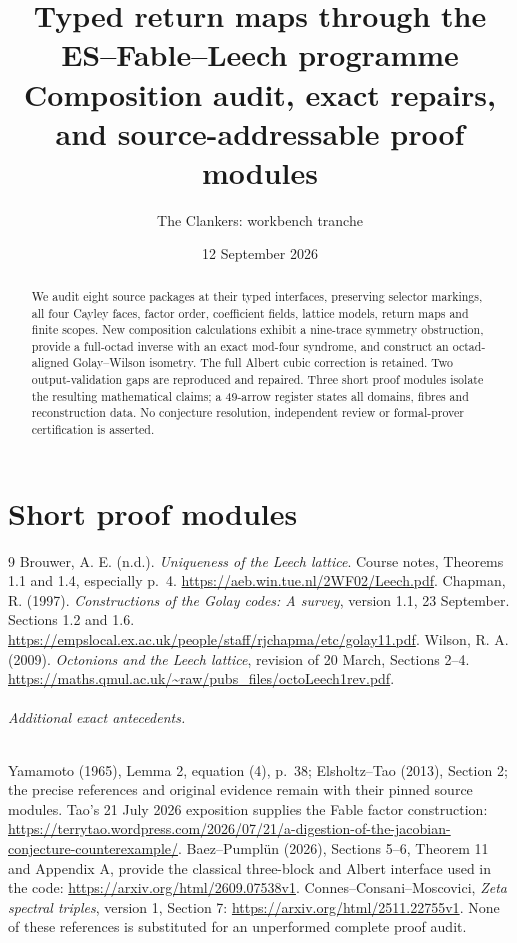\documentclass[10pt,reqno]{amsart}
\title[Typed return maps and composition audit]{Typed return maps through the ES--Fable--Leech programme\\
Composition audit, exact repairs, and source-addressable proof modules}
\author{The Clankers: workbench tranche}
\date{12 September 2026}
\theoremstyle{remark}\newtheorem{remark}[theorem]{Remark}
\begin{document}
\begin{abstract}
We audit eight source packages at their typed interfaces, preserving selector markings, all four Cayley faces, factor order, coefficient fields, lattice models, return maps and finite scopes. New composition calculations exhibit a nine-trace symmetry obstruction, provide a full-octad inverse with an exact mod-four syndrome, and construct an octad-aligned Golay--Wilson isometry. The full Albert cubic correction is retained. Two output-validation gaps are reproduced and repaired. Three short proof modules isolate the resulting mathematical claims; a 49-arrow register states all domains, fibres and reconstruction data. No conjecture resolution, independent review or formal-prover certification is asserted.
\end{abstract}
\maketitle
\tableofcontents

\clearpage
\part*{Short proof modules}

\clearpage

\clearpage

\clearpage

\begin{thebibliography}{9}
 Brouwer, A. E. (n.d.). \emph{Uniqueness of the Leech lattice}. Course notes, Theorems 1.1 and 1.4, especially p.~4. \url{https://aeb.win.tue.nl/2WF02/Leech.pdf}.
 Chapman, R. (1997). \emph{Constructions of the Golay codes: A survey}, version 1.1, 23 September. Sections 1.2 and 1.6. \url{https://empslocal.ex.ac.uk/people/staff/rjchapma/etc/golay11.pdf}.
 Wilson, R. A. (2009). \emph{Octonions and the Leech lattice}, revision of 20 March, Sections 2--4. \url{https://maths.qmul.ac.uk/~raw/pubs_files/octoLeech1rev.pdf}.
\end{thebibliography}

\paragraph{Additional exact antecedents.}
Yamamoto (1965), Lemma 2, equation (4), p.~38; Elsholtz--Tao (2013), Section 2; the precise references and original evidence remain with their pinned source modules. Tao's 21 July 2026 exposition supplies the Fable factor construction: \url{https://terrytao.wordpress.com/2026/07/21/a-digestion-of-the-jacobian-conjecture-counterexample/}. Baez--Pumpl\"un (2026), Sections 5--6, Theorem 11 and Appendix A, provide the classical three-block and Albert interface used in the code: \url{https://arxiv.org/html/2609.07538v1}. Connes--Consani--Moscovici, \emph{Zeta spectral triples}, version 1, Section 7: \url{https://arxiv.org/html/2511.22755v1}. None of these references is substituted for an unperformed complete proof audit.
\end{document}
